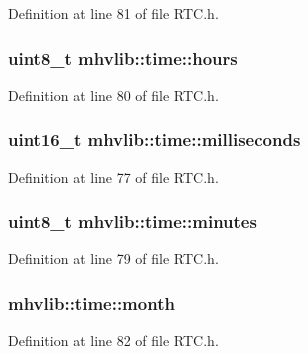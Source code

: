 Definition at line 81 of file R\-T\-C.\-h.

\hypertarget{structmhvlib_1_1time_a21c3499e1eee705b238737c764d9bdc7}{
\subsubsection[{hours}]{\setlength{\rightskip}{0pt plus 5cm}uint8\-\_\-t mhvlib\-::time\-::hours}}\label{structmhvlib_1_1time_a21c3499e1eee705b238737c764d9bdc7}


Definition at line 80 of file R\-T\-C.\-h.

\hypertarget{structmhvlib_1_1time_a0b0b145a52365fb68e077e3ebcef28b8}{
\subsubsection[{milliseconds}]{\setlength{\rightskip}{0pt plus 5cm}uint16\-\_\-t mhvlib\-::time\-::milliseconds}}\label{structmhvlib_1_1time_a0b0b145a52365fb68e077e3ebcef28b8}


Definition at line 77 of file R\-T\-C.\-h.

\hypertarget{structmhvlib_1_1time_a19b38390c496f5c4d7557f136e1dc570}{
\subsubsection[{minutes}]{\setlength{\rightskip}{0pt plus 5cm}uint8\-\_\-t mhvlib\-::time\-::minutes}}\label{structmhvlib_1_1time_a19b38390c496f5c4d7557f136e1dc570}


Definition at line 79 of file R\-T\-C.\-h.

\hypertarget{structmhvlib_1_1time_af2ff6a04a1b94055373c39b9c5f3868c}{
\subsubsection[{month}]{ mhvlib\-::time\-::month}}\label{structmhvlib_1_1time_af2ff6a04a1b94055373c39b9c5f3868c}


Definition at line 82 of file R\-T\-C.\-h.

